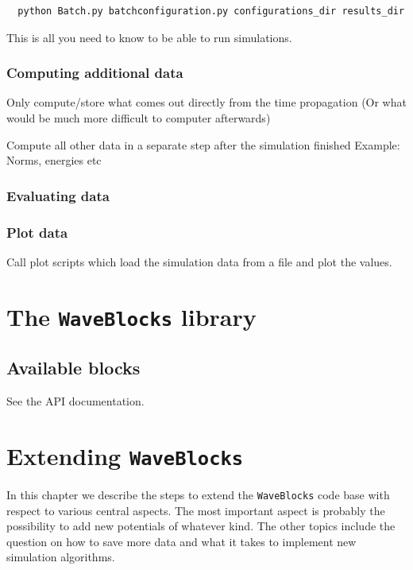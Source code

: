 \documentclass[a4paper,10pt]{report}
\begin{document}
\begin{verbatim}
  python Batch.py batchconfiguration.py configurations_dir results_dir
\end{verbatim}

This is all you need to know to be able to run simulations.



\subsection{Computing additional data}

Only compute/store what comes out directly from the time propagation
(Or what would be much more difficult to computer afterwards)

Compute all other data in a separate step after the simulation finished
Example: Norms, energies etc

\subsection{Evaluating data}

\subsection{Plot data}

Call plot scripts which load the simulation data from a file and plot the values.



\chapter{The \texttt{WaveBlocks} library}

\section{Available blocks}

See the API documentation.


\chapter{Extending \texttt{WaveBlocks}}

In this chapter we describe the steps to extend the \texttt{WaveBlocks}
code base with respect to various central aspects. The most important aspect
is probably the possibility to add new potentials of whatever kind. The other
topics include the question on how to save more data and what it takes to
implement new simulation algorithms.
\end{document}
